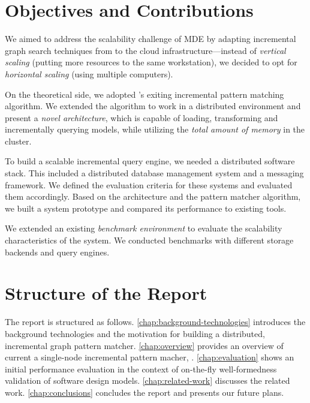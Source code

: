 \section{Objectives and Contributions}

We aimed to address the scalability challenge of MDE by adapting incremental graph search techniques from \eiq{} to the cloud infrastructure---instead of \emph{vertical scaling} (putting more resources to the same workstation), we decided to opt for \emph{horizontal scaling} (using multiple computers).

On the theoretical side, we adopted \eiq{}'s exiting incremental pattern matching algorithm. We extended the algorithm to work in a distributed environment and present a \emph{novel architecture}, which is capable of loading, transforming and incrementally querying models, while utilizing the \emph{total amount of memory} in the cluster. 

To build a scalable incremental query engine, we needed a distributed software stack. This included a distributed database management system and a messaging framework. We defined the evaluation criteria for these systems and evaluated them accordingly. Based on the architecture and the pattern matcher algorithm, we built a system prototype and compared its performance to existing tools.

We extended an existing \emph{benchmark environment} to evaluate the scalability characteristics of the system. We conducted benchmarks with different storage backends and query engines.

\section{Structure of the Report}
 
The report is structured as follows. 
\autoref{chap:background-technologies} introduces the background technologies and the motivation for building a distributed, incremental graph pattern matcher. \autoref{chap:overview} provides an overview of current a single-node incremental pattern macher, \eiq{}. 
\autoref{chap:evaluation} shows an initial performance evaluation in the context of on-the-fly well-formedness validation of software design models. 
\autoref{chap:related-work} discusses the related work. \autoref{chap:conclusions} concludes the report and presents our future plans. 

